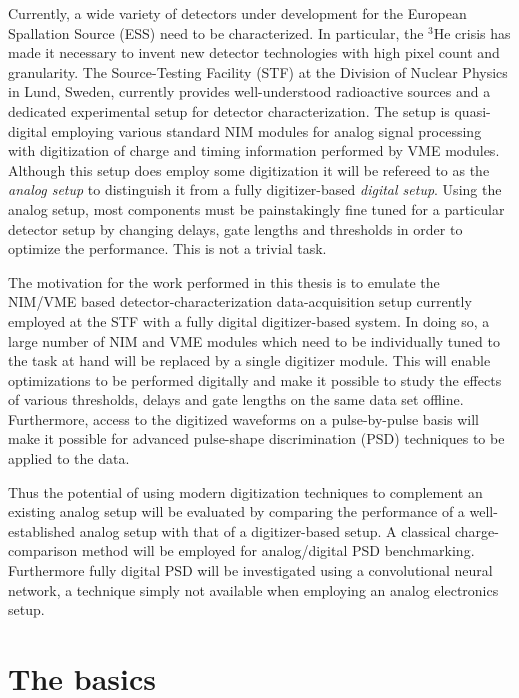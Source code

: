 \documentclass[main.tex]{subfiles}
\begin{document}
Currently, a wide variety of detectors under development for the European Spallation Source (ESS) need to be characterized. In particular, the $^\textrm{3}$He crisis has made it necessary to invent new detector technologies with high pixel count and granularity. The Source-Testing Facility (STF) at the Division of Nuclear Physics in Lund, Sweden, currently provides well-understood radioactive sources and a dedicated experimental setup for detector characterization. 
The setup is quasi-digital employing various standard NIM modules for analog signal processing with digitization of charge and timing information performed by VME modules. Although this setup does employ some digitization it will be refereed to as the \textit{analog setup} to distinguish it from a fully digitizer-based \textit{digital setup}. Using the analog setup, most components must be painstakingly fine tuned for a particular detector setup by changing delays, gate lengths and thresholds in order to optimize the performance. This is not a trivial task. 

The motivation for the work performed in this thesis is to emulate the NIM/VME based detector-characterization data-acquisition setup currently employed at the STF with a fully digital digitizer-based  system. In doing so, a large number of NIM and VME modules which need to be individually tuned to the task at hand will be replaced by a single digitizer module. 
This will enable optimizations to be performed digitally and make it possible to study the effects of various thresholds, delays and gate lengths on the same data set offline. Furthermore, access to the digitized waveforms on a pulse-by-pulse basis will make it possible for advanced pulse-shape discrimination (PSD) techniques to be applied to the data.

Thus the potential of using modern digitization techniques to complement an existing analog setup will be evaluated by comparing the performance of a well-established analog setup with that of a digitizer-based setup. A classical charge-comparison method will be employed for analog/digital PSD benchmarking. Furthermore fully digital PSD will be investigated using a convolutional neural network, a technique simply not available when employing an analog electronics setup.

\section{The basics}
\end{document}
